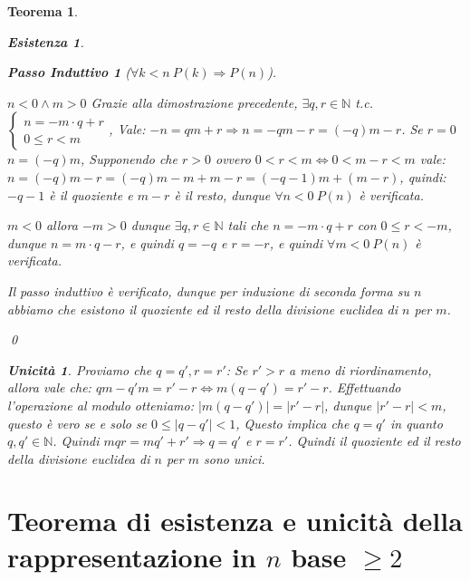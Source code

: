 \documentclass{article}
\makeatletter
\renewenvironment{proof}[1][\proofname]{\par
    \pushQED{\qed}%
    \normalfont \topsep6\p@\@plus6\p@\relax
    \trivlist
    \item\relax
    {\itshape
    #1\@addpunct{.}}\hspace\labelsep\ignorespaces
    }{%
    \popQED\endtrivlist\@endpefalse
}
\newtheorem{theorem}{Teorema}[part]
\theoremstyle{definition}
\newtheorem*{existence}{Esistenza}
\newtheorem*{uniqueness}{Unicità}
\newtheorem*{step}{Passo Induttivo}
\newcommand{\N}{\mathbb{N}}
\makeatother
\begin{document}
\begin{theorem}
\begin{proof}
\begin{existence}
\begin{step}[$\forall k<n\ P(k)\Rightarrow P(n)$]
\begin{list}{\leftmargin=1.5em}
                    \item{\(n<0\land m>0\)} Grazie alla dimostrazione precedente, \(\exists q,r\in\N\) t.c. \(\begin{cases}n=-m\cdot q+r\\0\leq r<m\end{cases}\), Vale: \(-n=qm+r\Rightarrow n=-qm-r=(-q)m-r\). Se \(r=0\) \(n=(-q)m\), Supponendo che \(r>0\) ovvero \(0<r<m\Leftrightarrow 0<m-r<m\) vale: \(n=(-q)m-r=(-q)m-m+m-r=(-q-1)m+(m-r)\), quindi: \(-q-1\) è il quoziente e \(m-r\) è il resto, dunque \(\forall n<0\ P(n)\) è verificata.
                    \item{\(m<0\)} allora \(-m>0\) dunque \(\exists q,r \in\mathbb{N}\) tali che \(n=-m\cdot q+r\) con \(0\leq r<-m\), dunque \(n=m\cdot q-r\), e quindi \(q=-q\) e \(r=-r\), e quindi \(\forall m<0\ P(n)\) è verificata.
                \end{list}
            \end{step}
            Il passo induttivo è verificato, dunque per induzione di seconda forma su \(n\) abbiamo che esistono il quoziente ed il resto della divisione euclidea di \(n\) per \(m\).
        \end{existence} 
        \qed
        \begin{uniqueness}
            Proviamo che \(q=q', r=r'\):
            Se \(r'>r\) a meno di riordinamento, allora vale che: \(qm-q'm=r'-r\Leftrightarrow m(q-q')=r'-r\).
            Effettuando l'operazione al modulo otteniamo: \(|m(q-q')|=|r'-r|\), dunque \(|r'-r|<m\), questo è vero se e solo se \(0\leq|q-q'|<1\),
            Questo implica che \(q=q'\) in quanto \(q,q'\in\mathbb{N}\).
            Quindi \(mqr=mq'+r'\Rightarrow q=q'\) e \(r=r'\).
            Quindi il quoziente ed il resto della divisione euclidea di \(n\) per \(m\) sono unici.
        \end{uniqueness}
        \raggedleft{\pushQED{\ensuremath{\blacksquare}}}
    \end{proof}
\end{theorem}
\part{Teorema di esistenza e unicità della rappresentazione in \(n\) base \(\ge 2\)}
\end{document}
